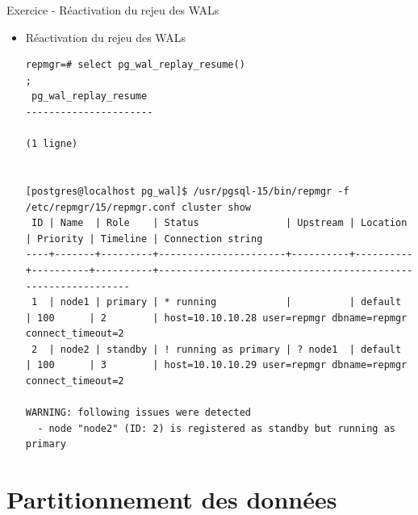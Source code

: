 \begin{frame}[fragile]{Exercice - Réactivation du rejeu des WALs}

   \begin{itemize}
      \item Réactivation du rejeu des WALs
\begin{tiny}
\begin{Verbatim}[commandchars=\&\{\}]
repmgr=# select pg_wal_replay_resume()
;
 pg_wal_replay_resume
----------------------

(1 ligne)


[postgres@localhost pg_wal]$ /usr/pgsql-15/bin/repmgr -f /etc/repmgr/15/repmgr.conf cluster show                                                                                             
 ID | Name  | Role    | Status               | Upstream | Location | Priority | Timeline | Connection string                                                                                 
----+-------+---------+----------------------+----------+----------+----------+----------+--------------------------------------------------------------                                     
 1  | node1 | primary | * running            |          | default  | 100      | 2        | host=10.10.10.28 user=repmgr dbname=repmgr connect_timeout=2                                      
 2  | node2 | standby | ! running as primary | ? node1  | default  | 100      | 3        | host=10.10.10.29 user=repmgr dbname=repmgr connect_timeout=2                                      

WARNING: following issues were detected
  - node "node2" (ID: 2) is registered as standby but running as primary
\end{Verbatim}
\end{tiny}
   \end{itemize}

\end{frame}




\section{Partitionnement des données}


